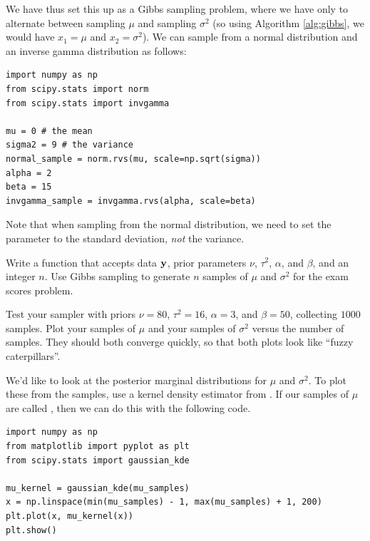We have thus set this up as a Gibbs sampling problem, where we have only to alternate between sampling $\mu$ and sampling $\sigma^{2}$ (so using Algorithm \ref{alg:gibbs}, we would have $x_1 = \mu$ and $x_2 = \sigma^2$).
We can sample from a normal distribution and an inverse gamma distribution as follows:
\begin{lstlisting}
import numpy as np
from scipy.stats import norm
from scipy.stats import invgamma

mu = 0 # the mean
sigma2 = 9 # the variance
normal_sample = norm.rvs(mu, scale=np.sqrt(sigma))
alpha = 2
beta = 15
invgamma_sample = invgamma.rvs(alpha, scale=beta)
\end{lstlisting}
Note that when sampling from the normal distribution, we need to set the  parameter to the standard deviation, \emph{not} the variance.

\begin{problem}
Write a function that accepts data $\mathbf{y}$, prior parameters $\nu$, $\tau^2$, $\alpha$, and $\beta$, and an integer $n$.
Use Gibbs sampling to generate $n$ samples of $\mu$ and $\sigma^2$ for the exam scores problem.

Test your sampler with priors $\nu=80$, $\tau^{2} = 16$, $\alpha = 3$, and $\beta = 50$, collecting $1000$ samples.
Plot your samples of $\mu$ and your samples of $\sigma^{2}$ versus the number of samples.
They should both converge quickly, so that both plots look like ``fuzzy caterpillars''.
\end{problem}

We'd like to look at the posterior marginal distributions for $\mu$ and $\sigma^2$.
To plot these from the samples, use a kernel density estimator from .
If our samples of $\mu$ are called , then we can do this with the following code.
\begin{lstlisting}
import numpy as np
from matplotlib import pyplot as plt
from scipy.stats import gaussian_kde

mu_kernel = gaussian_kde(mu_samples)
x = np.linspace(min(mu_samples) - 1, max(mu_samples) + 1, 200)
plt.plot(x, mu_kernel(x))
plt.show()
\end{lstlisting}

